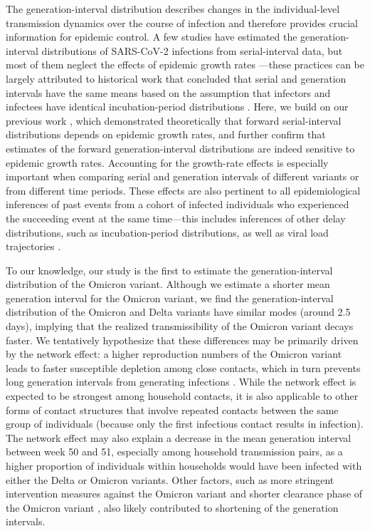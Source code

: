 \documentclass[12pt]{article}
\begin{document}
The generation-interval distribution describes changes in the individual-level transmission dynamics over the course of infection and therefore provides crucial information for epidemic control.
A few studies have estimated the generation-interval distributions of SARS-CoV-2 infections from serial-interval data, but most of them neglect the effects of epidemic growth rates \citep{ganyani2020estimating,he2020temporal,zhao2021estimating,hart2022generation}---these practices can be largely attributed to historical work that concluded that serial and generation intervals have the same means based on the assumption that infectors and infectees have identical incubation-period distributions \citep{svensson2007note,britton2019estimation,lehtinen2021relationship}.
Here, we build on our previous work \citep{park2021forward}, which demonstrated theoretically that forward serial-interval distributions depends on epidemic growth rates, and further confirm that estimates of the forward generation-interval distributions are indeed sensitive to epidemic growth rates.
Accounting for the growth-rate effects is especially important when comparing serial and generation intervals of different variants or from different time periods.
These effects are also pertinent to all epidemiological inferences of past events from a cohort of infected individuals who experienced the succeeding event at the same time---this includes inferences of other delay distributions, such as incubation-period distributions, as well as viral load trajectories \citep{hay2021estimating}.

To our knowledge, our study is the first to estimate the generation-interval distribution of the Omicron variant.
Although we estimate a shorter mean generation interval for the Omicron variant, we find the generation-interval distribution of the Omicron and Delta variants have similar modes (around 2.5 days), implying that the realized transmissibility of the Omicron variant decays faster.
We tentatively hypothesize that these differences may be primarily driven by the network effect: a higher reproduction numbers of the Omicron variant leads to faster susceptible depletion among close contacts, which in turn prevents long generation intervals from generating infections \citep{park2020inferring,hart2022generation}. 
While the network effect is expected to be strongest among household contacts, it is also applicable to other forms of contact structures that involve repeated contacts between the same group of individuals (because only the first infectious contact results in infection).
The network effect may also explain a decrease in the mean generation interval between week 50 and 51, especially among household transmission pairs, as a higher proportion of individuals within households would have been infected with either the Delta or Omicron variants.
Other factors, such as more stringent intervention measures against the Omicron variant \citep{backer2021omicron} and shorter clearance phase of the Omicron variant \citep{hay2022viral}, also likely contributed to shortening of the generation intervals.
\end{document}
